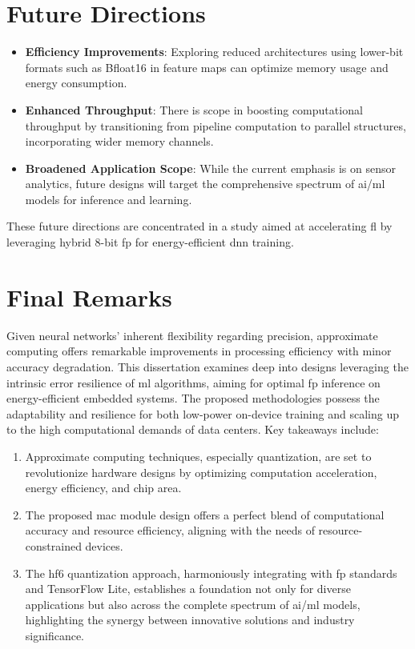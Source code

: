 \section{Future Directions}
\begin{itemize}
	\item \textbf{Efficiency Improvements}: Exploring reduced architectures using lower-bit formats such as Bfloat16 in feature maps can optimize memory usage and energy consumption.
	
	\item \textbf{Enhanced Throughput}: There is scope in boosting computational throughput by transitioning from pipeline computation to parallel structures, incorporating wider memory channels.
	
	\item \textbf{Broadened Application Scope}: While the current emphasis is on sensor analytics, future designs will target the comprehensive spectrum of \gls{ai}/\gls{ml} models for inference and learning.
\end{itemize}

These future directions are concentrated in a study aimed at accelerating \gls{fl} by leveraging hybrid 8-bit \gls{fp} for energy-efficient \gls{dnn} training.


\section{Final Remarks}
Given neural networks' inherent flexibility regarding precision, approximate computing offers remarkable improvements in processing efficiency with minor accuracy degradation. This dissertation examines deep into designs leveraging the intrinsic error resilience of \gls{ml} algorithms, aiming for optimal \gls{fp} inference on energy-efficient embedded systems. The proposed methodologies possess the adaptability and resilience for both low-power on-device training and scaling up to the high computational demands of data centers. Key takeaways include:

\begin{enumerate}
	\item Approximate computing techniques, especially quantization, are set to revolutionize hardware designs by optimizing computation acceleration, energy efficiency, and chip area.
	
	\item The proposed \gls{mac} module design offers a perfect blend of computational accuracy and resource efficiency, aligning with the needs of resource-constrained devices.
	
	
	\item The \gls{hf6} quantization approach, harmoniously integrating with \gls{fp} standards and TensorFlow Lite, establishes a foundation not only for diverse applications but also across the complete spectrum of \gls{ai}/\gls{ml} models, highlighting the synergy between innovative solutions and industry significance.
\end{enumerate}

